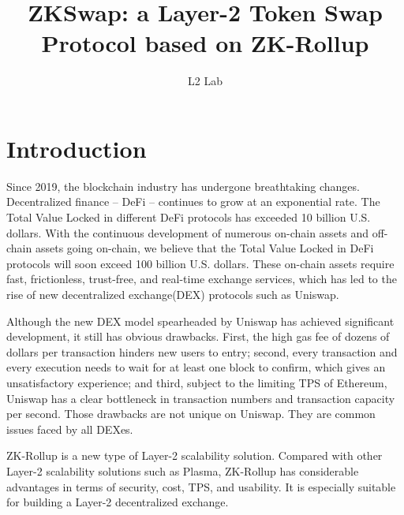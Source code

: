 \documentclass[]{template/llncs}
\begin{document}

\pagestyle{plain}

%
\title{ZKSwap: a Layer-2 Token Swap Protocol based on ZK-Rollup}

\author{L2 Lab}


\maketitle

%
\section{Introduction}

Since 2019, the blockchain industry has undergone breathtaking changes. Decentralized finance -- DeFi -- continues to grow at an exponential rate. The Total Value Locked in different DeFi protocols has exceeded 10 billion U.S. dollars. With the continuous development of numerous on-chain assets and off-chain assets going on-chain, we believe that the Total Value Locked in DeFi protocols will soon exceed 100 billion U.S. dollars. These on-chain assets require fast, frictionless, trust-free, and real-time exchange services, which has led to the rise of new decentralized exchange(DEX) protocols such as Uniswap\cite{uniswapofficial}.

Although the new DEX model spearheaded by Uniswap has achieved significant development, it still has obvious drawbacks. First, the high gas fee of dozens of dollars per transaction hinders new users to entry; second, every transaction and every execution needs to wait for at least one block to confirm, which gives an unsatisfactory experience; and third, subject to the limiting TPS of Ethereum, Uniswap has a clear bottleneck in transaction numbers and transaction capacity per second. Those drawbacks are not unique on Uniswap. They are common issues faced by all DEXes.

ZK-Rollup\cite{zkrollups} is a new type of Layer-2 scalability solution. Compared with other Layer-2 scalability solutions such as Plasma, ZK-Rollup has considerable advantages in terms of security, cost, TPS, and usability. It is especially suitable for building a Layer-2 decentralized exchange.
\end{document}
